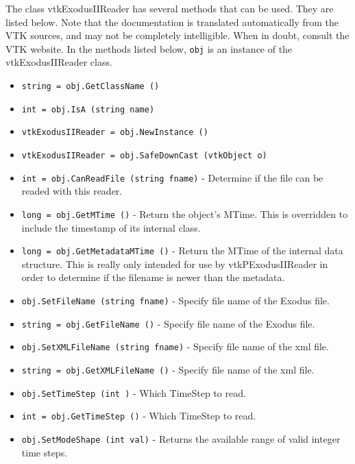 The class vtkExodusIIReader has several methods that can be used.
  They are listed below.
Note that the documentation is translated automatically from the VTK sources,
and may not be completely intelligible.  When in doubt, consult the VTK website.
In the methods listed below, \verb|obj| is an instance of the vtkExodusIIReader class.
\begin{itemize}
\item  \verb|string = obj.GetClassName ()|

\item  \verb|int = obj.IsA (string name)|

\item  \verb|vtkExodusIIReader = obj.NewInstance ()|

\item  \verb|vtkExodusIIReader = obj.SafeDownCast (vtkObject o)|

\item  \verb|int = obj.CanReadFile (string fname)| -  Determine if the file can be readed with this reader.

\item  \verb|long = obj.GetMTime ()| -  Return the object's MTime. This is overridden to include the timestamp of its internal class.

\item  \verb|long = obj.GetMetadataMTime ()| -  Return the MTime of the internal data structure.
 This is really only intended for use by vtkPExodusIIReader in order
 to determine if the filename is newer than the metadata.

\item  \verb|obj.SetFileName (string fname)| -  Specify file name of the Exodus file.

\item  \verb|string = obj.GetFileName ()| -  Specify file name of the Exodus file.

\item  \verb|obj.SetXMLFileName (string fname)| -  Specify file name of the xml file.

\item  \verb|string = obj.GetXMLFileName ()| -  Specify file name of the xml file.

\item  \verb|obj.SetTimeStep (int )| -  Which TimeStep to read.    

\item  \verb|int = obj.GetTimeStep ()| -  Which TimeStep to read.    

\item  \verb|obj.SetModeShape (int val)| -  Returns the available range of valid integer time steps.


\end{itemize}
